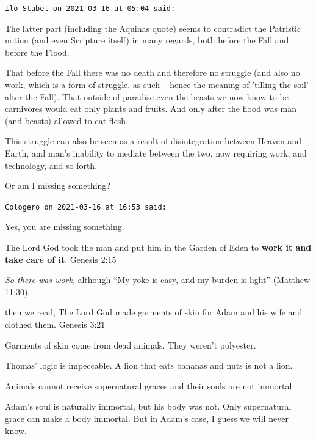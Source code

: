 \begin{footnotesize}
\begin{sffamily}

\texttt{Ilo Stabet on 2021-03-16 at 05:04 said:}

The latter part (including the Aquinas quote) seems to contradict the Patristic notion (and even Scripture itself) in many regards, both before the Fall and before the Flood.

That before the Fall there was no death and therefore no struggle (and also no work, which is a form of struggle, as such -- hence the meaning of 'tilling the soil' after the Fall). That outside of paradise even the beasts we now know to be carnivores would eat only plants and fruits. And only after the flood was man (and beasts) allowed to eat flesh.

This struggle can also be seen as a result of disintegration between Heaven and Earth, and man's inability to mediate between the two, now requiring work, and technology, and so forth.

Or am I missing something?

\hfill

\texttt{Cologero on 2021-03-16 at 16:53 said:}

Yes, you are missing something.

The Lord God took the man and put him in the Garden of Eden to \textbf{work it and take care of it}. Genesis 2:15

\emph{So there was work}, although ``My yoke is easy, and my burden is light'' (Matthew 11:30).

then we read, The Lord God made garments of skin for Adam and his wife and clothed them. Genesis 3:21

Garments of skin come from dead animals. They weren't polyester.

Thomas' logic is impeccable. A lion that eats bananas and nuts is not a lion.

Animals cannot receive supernatural graces and their souls are not immortal.

Adam's soul is naturally immortal, but his body was not. Only supernatural grace can make a body immortal. But in Adam's case, I guess we will never know.

\hfill

\end{sffamily}
\end{footnotesize}


